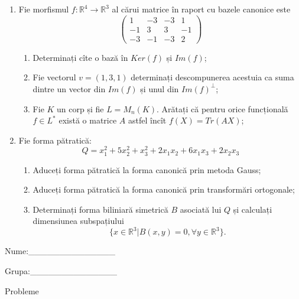 \documentclass{article}
\begin{document}
\begin{enumerate}
 \item Fie morfismul $f:\mathbb{R}^4 \to \mathbb{R}^3$ al cărui matrice în raport cu bazele canonice este
$$\begin{pmatrix}
1&-3&-3&1\\
-1&3&3&-1\\
-3&-1&-3&2
\end{pmatrix}$$

\begin{enumerate}
\item Determinați cîte o bază în $Ker(f)$ și $Im(f)$;
\item Fie vectorul $v=(1,3,1)$ determinați descompunerea acestuia ca suma dintre un vector din $Im(f)$ și unul din $Im(f)^\perp$;
\item Fie $K$ un corp și fie $L=M_n(K)$. Arătați că pentru orice funcțională $f \in L^*$ există o matrice $A$ astfel încît $f(X)=Tr(AX)$;
\end{enumerate}
\item Fie forma pătratică:
$$Q= x_1^2+5x_2^2+x_3^2+2x_1x_2+6x_1x_3+2x_2x_3$$

\begin{enumerate}
\item Aduceți forma pătratică la forma canonică prin metoda Gauss;
\item Aduceți forma pătratică la forma canonică prin transformări ortogonale;
\item Determinați forma biliniară simetrică $B$ asociată lui $Q$ și calculați dimensiunea subspațiului
$$\{x \in \mathbb{R}^3 | B(x,y)=0,\forall y \in \mathbb{R}^3\}.$$

\end{enumerate}
\end{enumerate}
\newpage
\begin{flushright}
Nume:\_\_\_\_\_\_\_\_\_\_\_\_\_\_
 
 
Grupa:\_\_\_\_\_\_\_\_\_\_\_\_\_\_
\end{flushright}
\begin{center}
\vspace{2cm}
{\Large Probleme}
\vspace{2cm}
\end{center}
\end{document}
